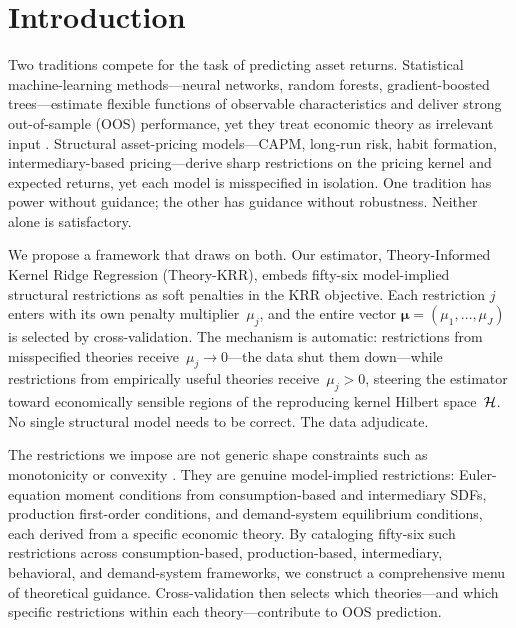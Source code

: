 
\section{Introduction}\label{sec:introduction}

Two traditions compete for the task of predicting asset returns. Statistical machine-learning methods---neural networks, random forests, gradient-boosted trees---estimate flexible functions of observable characteristics and deliver strong out-of-sample (OOS) performance, yet they treat economic theory as irrelevant input \citep{gu2020empirical}. Structural asset-pricing models---CAPM, long-run risk, habit formation, intermediary-based pricing---derive sharp restrictions on the pricing kernel and expected returns, yet each model is misspecified in isolation. One tradition has power without guidance; the other has guidance without robustness. Neither alone is satisfactory.

We propose a framework that draws on both. Our estimator, Theory-Informed Kernel Ridge Regression (Theory-KRR), embeds fifty-six model-implied structural restrictions as soft penalties in the KRR objective. Each restriction $j$ enters with its own penalty multiplier~$\mu_j$, and the entire vector $\bm{\mu} = (\mu_1, \dots, \mu_J)$ is selected by cross-validation. The mechanism is automatic: restrictions from misspecified theories receive~$\mu_j \to 0$---the data shut them down---while restrictions from empirically useful theories receive~$\mu_j > 0$, steering the estimator toward economically sensible regions of the reproducing kernel Hilbert space~$\mathcal{H}$. No single structural model needs to be correct. The data adjudicate.

The restrictions we impose are not generic shape constraints such as monotonicity or convexity \citep{bryzgalova2023asset}. They are genuine model-implied restrictions: Euler-equation moment conditions from consumption-based and intermediary SDFs, production first-order conditions, and demand-system equilibrium conditions, each derived from a specific economic theory. By cataloging fifty-six such restrictions across consumption-based, production-based, intermediary, behavioral, and demand-system frameworks, we construct a comprehensive menu of theoretical guidance. Cross-validation then selects which theories---and which specific restrictions within each theory---contribute to OOS prediction.


